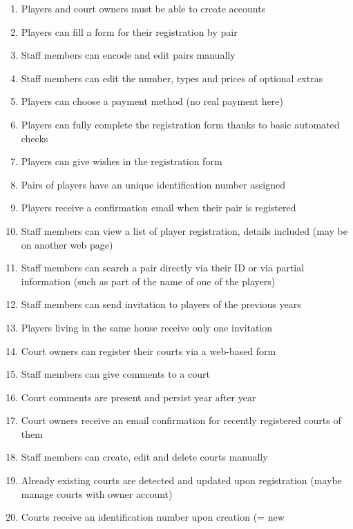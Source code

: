 \begin{enumerate}
	\itemsep-0.1em
\color{green!60!black}
    \item Players and court owners must be able to create accounts
    \item Players can fill a form for their registration by pair
    \item Staff members can encode and edit pairs manually
    \item Staff members can edit the number, types and prices of
        optional extras
    \item Players can choose a payment method (no real payment here)
    \item Players can fully complete the registration form thanks to
        basic automated checks
    \item Players can give wishes in the registration form
    \item Pairs of players have an unique identification number assigned
    \item Players receive a confirmation email when their pair is
        registered
    \item Staff members can view a list of player registration, details
        included (may be on another web page)
\color{red!80!black}
    \item Staff members can search a pair directly via their ID or via
        partial information (such as part of the name of one of the
        players)
    \item Staff members can send invitation to players of the previous
        years
    \item Players living in the same house receive only one invitation
\color{green!60!black}
    \item Court owners can register their courts via a web-based form
    \item Staff members can give comments to a court
    \item Court comments are present and persist year after year
    \item Court owners receive an email confirmation for recently
        registered courts of them
    \item Staff members can create, edit and delete courts manually
\color{red!80!black}
    \item Already existing courts are detected and updated upon
        registration (maybe manage courts with owner account)
\color{green!60!black}
    \item Courts receive an identification number upon creation (= new

\end{enumerate}
